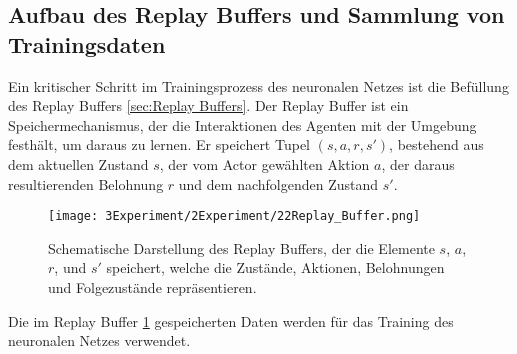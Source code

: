 
\subsection{Aufbau des Replay Buffers und Sammlung von Trainingsdaten}

Ein kritischer Schritt im Trainingsprozess des neuronalen Netzes ist die Befüllung des Replay Buffers \ref{sec:Replay Buffers}. Der Replay Buffer ist ein Speichermechanismus, der die Interaktionen des Agenten mit der Umgebung festhält, um daraus zu lernen. Er speichert Tupel \( (s, a, r, s') \), bestehend aus dem aktuellen Zustand \( s \), der vom Actor gewählten Aktion \( a \), der daraus resultierenden Belohnung \( r \) und dem nachfolgenden Zustand \( s' \).

\begin{figure}[htbp]
\centering
\texttt{[image: 3Experiment/2Experiment/22Replay\_Buffer.png]}
\caption{Schematische Darstellung des Replay Buffers, der die Elemente \( s \), \( a \), \( r \), und \( s' \) speichert, welche die Zustände, Aktionen, Belohnungen und Folgezustände repräsentieren.}
\label{fig:replay-buffer}
\end{figure}

Die im Replay Buffer \ref{fig:replay-buffer} gespeicherten Daten werden für das Training des neuronalen Netzes verwendet.

